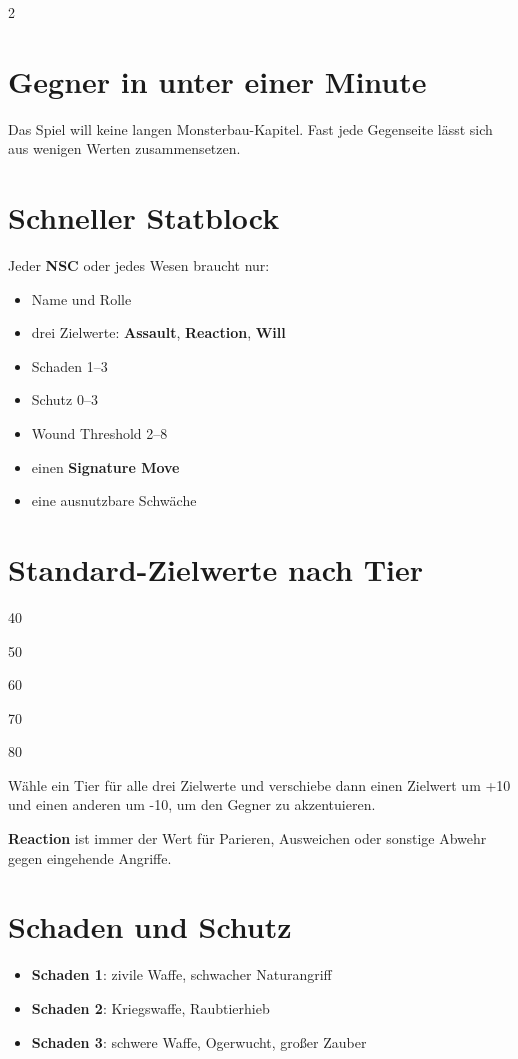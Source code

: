 \label{ch:spielleitung}

\begin{multicols*}{2}
\section{Gegner in unter einer Minute}
Das Spiel will keine langen Monsterbau-Kapitel. Fast jede Gegenseite lässt sich aus wenigen Werten zusammensetzen.

\section{Schneller Statblock}
Jeder \textbf{NSC} oder jedes Wesen braucht nur:
\begin{itemize}[leftmargin=*]
\item Name und Rolle
\item drei Zielwerte: \textbf{Assault}, \textbf{Reaction}, \textbf{Will}
\item Schaden 1--3
\item Schutz 0--3
\item Wound Threshold 2--8
\item einen \textbf{Signature Move}
\item eine ausnutzbare Schwäche
\end{itemize}

\section{Standard-Zielwerte nach Tier}
\begin{description}[style=nextline,leftmargin=0pt]
\item[\textbf{Frail}] 40
\item[\textbf{Trained}] 50
\item[\textbf{Veteran}] 60
\item[\textbf{Elite}] 70
\item[\textbf{Monstrous}] 80
\end{description}

Wähle ein Tier für alle drei Zielwerte und verschiebe dann einen Zielwert um +10 und einen anderen um -10, um den Gegner zu akzentuieren.

\textbf{Reaction} ist immer der Wert für Parieren, Ausweichen oder sonstige Abwehr gegen eingehende Angriffe.

\section{Schaden und Schutz}
\begin{itemize}[leftmargin=*]
\item \textbf{Schaden 1}: zivile Waffe, schwacher Naturangriff
\item \textbf{Schaden 2}: Kriegswaffe, Raubtierhieb
\item \textbf{Schaden 3}: schwere Waffe, Ogerwucht, großer Zauber
\end{itemize}


\end{multicols*}
